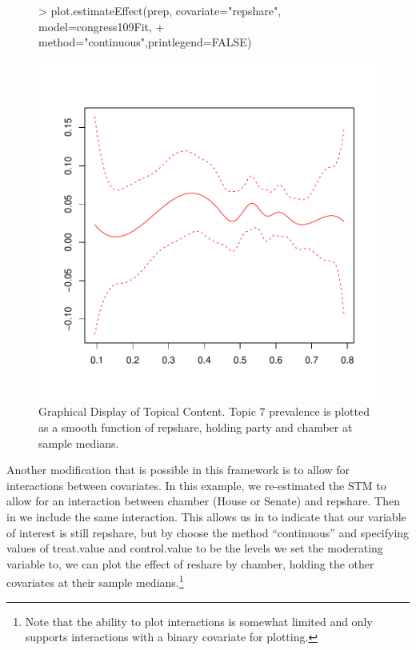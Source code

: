 \documentclass[nojss]{jss}
\begin{document}
\begin{figure}[t!]
\begin{center}
\begin{Schunk}
\begin{Sinput}
> plot.estimateEffect(prep, covariate="repshare", model=congress109Fit,
+                  method="continuous",printlegend=FALSE)
\end{Sinput}
\end{Schunk}
\includegraphics{stmVignette-016}
\caption{Graphical Display of Topical Content. Topic 7 prevalence is plotted as a smooth function of repshare, holding party and chamber at sample medians.}
\label{fig:spline}
\end{center}
\end{figure}

Another modification that is possible in this framework is to allow for interactions between covariates. In this example, we re-estimated the STM to allow for an interaction between chamber (House or Senate) and repshare. Then in  we include the same interaction. This allows us in  to indicate that our variable of interest is still repshare, but by choose the method ``continuous'' and specifying values of treat.value and control.value to be the levels we set the moderating variable to, we can plot the effect of reshare by chamber, holding the other covariates at their sample medians.\footnote{Note that the ability to plot interactions is somewhat limited and only supports interactions with a binary covariate for plotting.}
\end{document}
